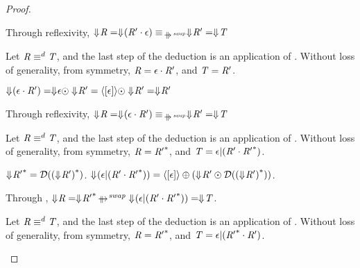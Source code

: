 \documentclass[numbers,10pt,preprint\ifanon ,nocopyrightspace\fi]{sigplanconf}
\begin{document}
\begin{proof}
\begin{case}[\ConcatIdentityLeftRule{}]
    Through reflexivity,
    $\ToDNFRegexOf{\Regex} = \ToDNFRegexOf{(\Regex' \Concat \EmptyString)}
    \EquivalenceOf{\ParallelRewriteSwap} \ToDNFRegexOf{\Regex'} =
    \ToDNFRegexOf{\RegexAlt}$
  \end{case}

  \begin{case}[\ConcatIdentityRightRule{}]
    Let $\mathit{R} \equiv^d \mathit{T}$, and the last step of the
    deduction is an application of \DistributivityRightRule{}.  Without loss of
    generality, from symmetry,
    $\mathit{R} = \epsilon \cdot \mathit{R}'$, and
    $\mathit{T} = \mathit{R}'$.

    $\Downarrow\mkern-4mu (\epsilon \cdot \mathit{R}') =
    \Downarrow\mkern-4mu \epsilon \odot \Downarrow\mkern-4mu \mathit{R}' =
    \langle[\epsilon]\rangle \odot \Downarrow\mkern-4mu \mathit{R}'=
    \Downarrow\mkern-4mu \mathit{R}'$
    
    Through reflexivity,
    $\ToDNFRegexOf{\Regex} = \ToDNFRegexOf{(\EmptyString \Concat \Regex')}
    \EquivalenceOf{\ParallelRewriteSwap} \ToDNFRegexOf{\Regex'} =
    \ToDNFRegexOf{\RegexAlt}$
  \end{case}

  \begin{case}[\UnrollstarLeftRule{}]
    Let $\mathit{R} \equiv^d \mathit{T}$, and the last step of the
    deduction is an application of \UnrollstarLeftRule{}.  Without loss of
    generality, from symmetry,
    $\mathit{R} = {\mathit{R}'}^*$, and
    $\mathit{T} = \epsilon | (\mathit{R}' \cdot {\ensuremath{\mathit{R}}'}^*)$.

    $\Downarrow\mkern-4mu {\mathit{R}'}^* =
    \mathcal{D}({(\Downarrow\mkern-4mu \mathit{R}')}^*)$.
    $\Downarrow\mkern-4mu (\epsilon | (\mathit{R}' \cdot {\ensuremath{\mathit{R}}'}^*)) =
    \langle[\epsilon]\rangle \oplus (\Downarrow\mkern-4mu \mathit{R}' \odot
    \mathcal{D}({(\Downarrow\mkern-4mu \mathit{R}')}^*))$.
    
    Through \AtomUnrollstarLeftRule{},
    $\ToDNFRegexOf{\Regex} =
    \ToDNFRegexOf{\StarOf{\Regex'}} \ParallelRewriteSwap
    \ToDNFRegexOf{(\EmptyString \Or (\Regex' \Concat \StarOf{\Regex'}))} =
    \ToDNFRegexOf{\RegexAlt}$.
  \end{case}

  \begin{case}[\UnrollstarRightRule{}]
    Let $\mathit{R} \equiv^d \mathit{T}$, and the last step of the
    deduction is an application of \UnrollstarRightRule{}.  Without loss of
    generality, from symmetry,
    $\mathit{R} = {\mathit{R}'}^*$, and
    $\mathit{T} = \epsilon | ({\mathit{R}'}^* \cdot \mathit{R}')$.


\end{case}
\end{proof}
\end{document}
